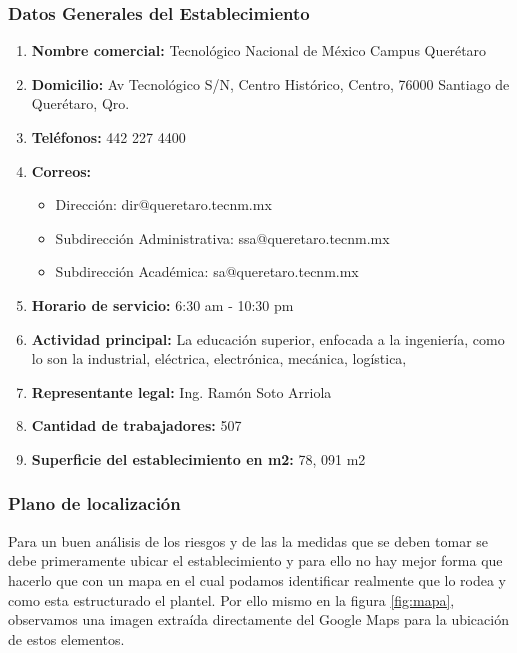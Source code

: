     \subsubsection{Datos Generales del Establecimiento}
    \begin{enumerate}
        \item \textbf{Nombre comercial:} 
        Tecnológico Nacional de México Campus Querétaro
        \item \textbf{Domicilio:} Av Tecnológico S/N, Centro Histórico, Centro, 76000 Santiago de Querétaro, Qro.
        \item \textbf{Teléfonos:} 442 227 4400
        \item \textbf{Correos:}
     
     
     \begin{itemize}
     \item Dirección: 
     dir@queretaro.tecnm.mx
     \item Subdirección Administrativa:
     ssa@queretaro.tecnm.mx
     \item Subdirección Académica: 
     sa@queretaro.tecnm.mx
     \end{itemize}
    
     
        \item \textbf{Horario de servicio:} 6:30 am - 10:30 pm
        \item \textbf{Actividad principal:} La educación superior, enfocada a la ingeniería, como lo son la industrial, eléctrica, electrónica, mecánica, logística,
        \item \textbf{Representante legal:}
         Ing. Ramón Soto Arriola
        \item \textbf{Cantidad de trabajadores:} 507
        
        \item \textbf{Superficie del establecimiento en m2:} 78, 091 m2
    \end{enumerate}
    
    \subsubsection{Plano de localización}
    Para un buen análisis de los riesgos y de las la medidas que se deben tomar se debe primeramente ubicar el establecimiento y para ello no hay mejor forma que hacerlo que con un mapa en el cual podamos identificar realmente que lo rodea y como esta estructurado el plantel. Por ello mismo en la figura \ref{fig:mapa}, observamos una imagen extraída directamente del Google Maps para la ubicación de estos elementos.
    
